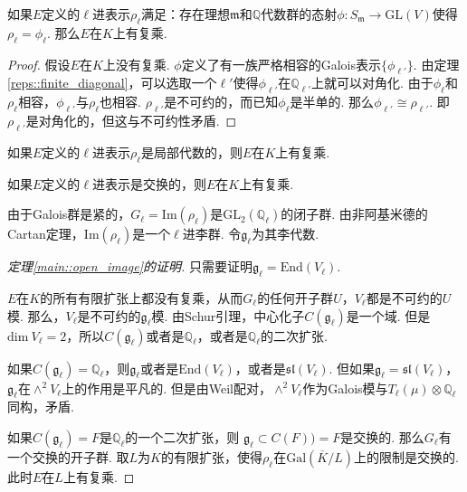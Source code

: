 \begin{cthm}
    如果$E$定义的$\ell$进表示$\rho_{\ell}$满足：存在理想$\mathfrak{m}$和$\mathbb{Q}$代数群的态射$\phi: S_{\mathfrak{m}}\to \mathrm{GL}(V)$使得$\rho_{\ell} = \phi_{\ell}$. 那么$E$在$K$上有复乘.
\end{cthm}

\begin{proof}
    假设$E$在$K$上没有复乘.
    $\phi$定义了有一族严格相容的Galois表示$\{\phi_{\ell'}\}$.
    由定理\ref{reps::finite_diagonal}，可以选取一个$\ell'$使得$\phi_{\ell'}$在$\mathbb{Q}_{\ell'}$上就可以对角化. 
    由于$\phi_{\ell}$和$\rho_{\ell}$相容，$\phi_{\ell'}$与$\rho_{\ell}$也相容.
    $\rho_{\ell'}$是不可约的，而已知$\phi_{\ell}$是半单的. 那么$\phi_{\ell'}\cong \rho_{\ell'}$.
    即$\rho_{\ell'}$是对角化的，但这与不可约性矛盾.
\end{proof}

\begin{ccor}
    如果$E$定义的$\ell$进表示$\rho_{\ell}$是局部代数的，则$E$在$K$上有复乘. \label{reps::when_cm}
\end{ccor}

\begin{ccor}
    如果$E$定义的$\ell$进表示是交换的，则$E$在$K$上有复乘.
\end{ccor}

由于Galois群是紧的，$G_{\ell} = \mathrm{Im}(\rho_\ell)$是$\mathrm{GL}_2(\mathbb{Q}_{\ell})$的闭子群. 由非阿基米德的Cartan定理{\parencite[][p. 155]{serre2009lie}}，$\mathrm{Im}(\rho_{\ell})$是一个$\ell$进李群. 令$\mathfrak{g}_{\ell}$为其李代数.

\begin{proof}[定理\ref{main::open_image}的证明]
    只需要证明$\mathfrak{g}_{\ell} = \mathrm{End}(V_{\ell})$.

    $E$在$K$的所有有限扩张上都没有复乘，从而$G_{\ell}$的任何开子群$U$，$V_{\ell}$都是不可约的$U$模. 那么，$V_{\ell}$是不可约的$\mathfrak{g}_{\ell}$模. 由Schur引理，中心化子$C(\mathfrak{g}_{\ell})$是一个域. 但是$\mathrm{dim}\ V_{\ell}=2$，所以$C(\mathfrak{g}_{\ell})$或者是$\mathbb{Q}_{\ell}$，或者是$\mathbb{Q}_{\ell}$的二次扩张.

    如果$C(\mathfrak{g}_{\ell}) = \mathbb{Q}_{\ell}$，则$\mathfrak{g}_{\ell}$或者是$\mathrm{End}(V_{\ell})$，或者是$\mathfrak{sl}(V_{\ell})$. 但如果$\mathfrak{g}_{\ell} = \mathfrak{sl}(V_{\ell})$，$\mathfrak{g}_{\ell}$在$\wedge^2 V_{\ell}$上的作用是平凡的. 但是由Weil配对，$\wedge^2 V_{\ell}$作为Galois模与$T_{\ell}(\mu)\otimes \mathbb{Q}_{\ell}$同构，矛盾.

    如果$C(\mathfrak{g}_{\ell}) = F$是$\mathbb{Q}_{\ell}$的一个二次扩张，则
    $\mathfrak{g}_{\ell}\subset C(F)) = F$是交换的. 那么$G_{\ell}$有一个交换的开子群.
    取$L$为$K$的有限扩张，使得$\rho_{\ell}$在$\mathrm{Gal}(\overline{K}/L)$上的限制是交换的.
    此时$E$在$L$上有复乘.

\end{proof}
